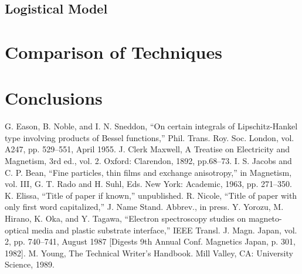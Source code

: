 \documentclass[conference]{IEEEtran}
\begin{document}
\subsection{Logistical Model}



\section{Comparison of Techniques}

\section{Conclusions}

\begin{thebibliography}{00}
 G. Eason, B. Noble, and I. N. Sneddon, ``On certain integrals of Lipschitz-Hankel type involving products of Bessel functions,'' Phil. Trans. Roy. Soc. London, vol. A247, pp. 529--551, April 1955.
 J. Clerk Maxwell, A Treatise on Electricity and Magnetism, 3rd ed., vol. 2. Oxford: Clarendon, 1892, pp.68--73.
 I. S. Jacobs and C. P. Bean, ``Fine particles, thin films and exchange anisotropy,'' in Magnetism, vol. III, G. T. Rado and H. Suhl, Eds. New York: Academic, 1963, pp. 271--350.
 K. Elissa, ``Title of paper if known,'' unpublished.
 R. Nicole, ``Title of paper with only first word capitalized,'' J. Name Stand. Abbrev., in press.
 Y. Yorozu, M. Hirano, K. Oka, and Y. Tagawa, ``Electron spectroscopy studies on magneto-optical media and plastic substrate interface,'' IEEE Transl. J. Magn. Japan, vol. 2, pp. 740--741, August 1987 [Digests 9th Annual Conf. Magnetics Japan, p. 301, 1982].
 M. Young, The Technical Writer's Handbook. Mill Valley, CA: University Science, 1989.
\end{thebibliography}
\vspace{12pt}
\end{document}

